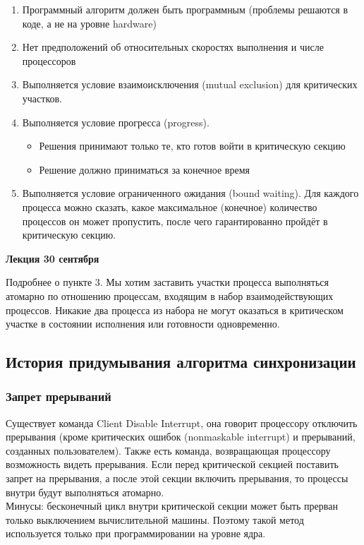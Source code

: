 \documentclass[12pt, a4paper]{article}
\begin{document}
    \begin{enumerate}
        \item Программный алгоритм должен быть программным (проблемы решаются в коде, а не на уровне hardware)
        \item Нет предположений об относительных скоростях выполнения и числе процессоров
        \item Выполняется условие взаимоисключения (mutual exclusion) для критических участков.
        \item Выполняется условие прогресса (progress).
        \begin{itemize}
            \item Решения принимают только те, кто готов войти в критическую секцию 
            \item Решение должно приниматься за конечное время
        \end{itemize} 
        \item Выполняется условие ограниченного ожидания (bound waiting). Для каждого процесса можно сказать, какое максимальное (конечное) количество процессов он может пропустить, после чего гарантированно пройдёт в критическую секцию.
    \end{enumerate}
    \begin{center}
        \textbf{Лекция 30 сентября}
    \end{center}
    Подробнее о пункте 3. Мы хотим заставить участки процесса выполняться атомарно по отношению процессам, входящим в набор взаимодействующих процессов. Никакие два процесса из набора не могут оказаться в критическом участке в состоянии исполнения или готовности одновременно.
    \subsection*{История придумывания алгоритма синхронизации}
    \subsubsection*{Запрет прерываний}
    Существует команда Client Disable Interrupt, она говорит процессору отключить прерывания (кроме критических ошибок (nonmaskable interrupt) и прерываний, созданных пользователем). Также есть команда, возвращающая процессору возможность видеть прерывания. Если перед критической секцией поставить запрет на прерывания, а после этой секции включить прерывания, то процессы внутри будут выполняться атомарно.\\
    Минусы: бесконечный цикл внутри критической секции может быть прерван только выключением вычислительной машины. Поэтому такой метод используется только при программировании на уровне ядра.
\end{document}
